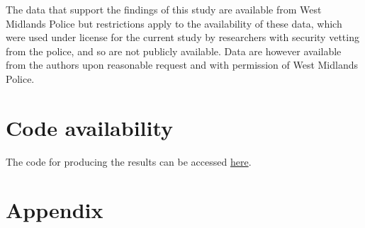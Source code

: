 \documentclass[12pt, letterpaper]{article}
\begin{document}
The data that support the findings of this study are available from West Midlands Police
but restrictions apply to the availability of these data, which were used under license
for the current study by researchers with security vetting from the police, and so are not publicly available. Data are however available from the authors upon reasonable request and with permission of West Midlands Police.

\section*{Code availability}

The code for producing the results can be accessed \href{https://osf.io/kg9yr/?view_only=172a33b467bd4566b2e5dea0e2f59f8c}{here}. 

\section*{Appendix}

\renewcommand{\thetable}{A\arabic{table}}
\renewcommand{\thefigure}{A\arabic{figure}}
\setcounter{table}{0}
\setcounter{figure}{0}
\end{document}
